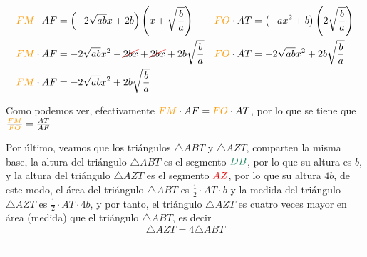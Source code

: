 \documentclass{amsart}
\begin{document}
{    \begin{align*}
        \fm \cdot AF &= \left(-2\sqrt{ab}x+2b\right)\left( x + \sqrt{\frac{b}{a}} \right) &
        \fo \cdot AT &= \left(-ax^2 + b\right)\left( 2 \sqrt{\frac{b}{a}} \right) \\
        \fm \cdot AF &= -2\sqrt{ab}x^2 - \cancelc[red]{2bx} + \cancelc[red]{2bx} + 2b \sqrt{\frac{b}{a}} &
        \fo \cdot AT &= -2\sqrt{ab}x^2 + 2b\sqrt{\frac{b}{a}} \\
        \fm \cdot AF &= -2\sqrt{ab}x^2 + 2b \sqrt{\frac{b}{a}} & \\
    \end{align*}

    Como podemos ver, efectivamente $\fm \cdot AF = \fo \cdot AT$, por lo que se tiene que $\frac{\fm}{\fo} = \frac{AT}{AF}$

    Por último, veamos que los triángulos $\triangle ABT$ y $\triangle AZT$, comparten la misma base, la altura del triángulo $\triangle ABT$ es el segmento $\db$, por lo que su altura es $b$, y la altura del triángulo $\triangle AZT$ es el segmento $\az$, por lo que su altura $4b$, de este modo, el área del triángulo $\triangle ABT$ es $\frac{1}{2} \cdot AT \cdot b$ y la medida del triángulo $\triangle AZT$ es $\frac{1}{2} \cdot  AT \cdot 4b $, y por tanto, el triángulo $\triangle AZT$ es cuatro veces mayor en área (medida) que el triángulo $\triangle ABT$, es decir
    $$ \triangle AZT = 4 \triangle ABT $$
}---
\end{document}
